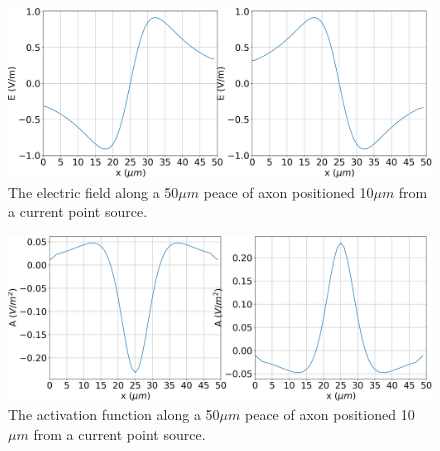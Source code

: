 \documentclass{scrartcl}			%
\begin{document}
\begin{figure}[hbpt!]					%
	\begin{flushleft}
		\hspace*{-0.3in}
		\includegraphics[scale=0.41]{2_2.png}
		\captionsetup{width=\linewidth}  %
		\caption{The electric field along a 50$\mu m$ peace of axon positioned 10$\mu m$ from a current point source.}		
		\label{fig22} %
	\end{flushleft}
\end{figure}

\begin{figure}[hbpt!]					%
	\begin{flushleft}
		\hspace*{-0.3in}
		\includegraphics[scale=0.41]{2_3.png}
		\captionsetup{width=\linewidth}  %
		\caption{The activation function along a 50$\mu m$ peace of axon positioned 10$\mu m$ from a current point source.}		
		\label{fig23} %
	\end{flushleft}
\end{figure}

\newpage
\end{document}
